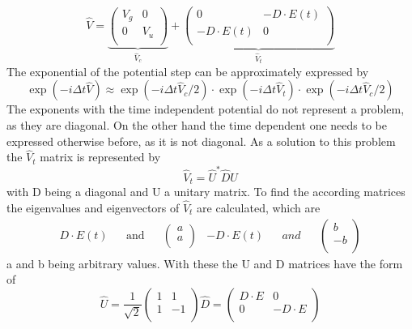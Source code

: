 \documentclass[12pt]{article}
\newcommand{\dt}{\Delta t}
\begin{document}
\begin{equation}
\hat V=\underbrace{
\begin{pmatrix}
V_g & 0\\
0 & V_u\\
\end{pmatrix}}_{\hat V_c}
+ \underbrace{
\begin{pmatrix}
0 & -D\cdot E(t)\\
-D\cdot E(t) & 0\\
\end{pmatrix}}_{\hat V_t}
\end{equation}
The exponential of the potential step can be approximately expressed by
\begin{equation}
\exp(-i\dt\hat V)\approx \exp(-i\dt\hat V_c/2)\cdot \exp(-i \dt\hat V_t) \cdot \exp(-i \dt\hat V_c/2)
\end{equation}
The exponents with the time independent potential do not represent a problem, as they are diagonal. On the other hand the time dependent one needs to be expressed otherwise before, as it is not diagonal.
As a solution to this problem the $\hat V_t$ matrix is represented by 
\begin{equation}
\hat V_t=\hat U^*\hat D\hat U
\end{equation}
with D being a diagonal and U a unitary matrix.
To find the according matrices the eigenvalues and eigenvectors of $\hat V_t$ are calculated, which are 
\begin{subequations}
\begin{align}
D\cdot E(t) &&\text{and} && \begin{pmatrix}
a\\
a\\
\end{pmatrix}
\end{align}
\begin{align}
-D\cdot E(t) && and & &\begin{pmatrix}
b\\
-b\\
\end{pmatrix}
\end{align}
\end{subequations}
a and b being arbitrary values.
With these the U and D matrices have the form of
\begin{subequations}
\begin{equation}
\hat U= \frac{1}{\sqrt{2}}\begin{pmatrix}
1 & 1\\
1 & -1\\
\end{pmatrix}
\end{equation}
\begin{equation}
\hat D=\begin{pmatrix}
D \cdot E & 0\\
0 & -D \cdot E\\
\end{pmatrix}
\end{equation}
\end{subequations}
\end{document}
